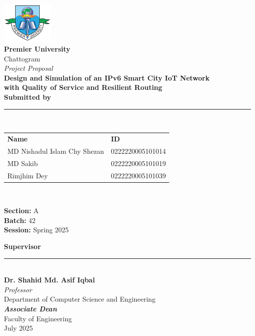 \documentclass[12pt,a4paper]{article}
\begin{document}
\begin{titlepage}
    \begin{center}
        \vspace*{0.4cm}
        \includegraphics[width=0.19\textwidth]{Logo_of_Premier_University_(PU).png}\\[0.8cm]
        
        {\fontsize{28}{34}\selectfont \textbf{Premier University}}\\[0.15cm]
        {\fontsize{17}{21}\selectfont Chattogram}\\[0.6cm]

        {\Large \textit{Project Proposal}}\\[0.2cm]

        {\fontsize{18}{24}\selectfont \textbf{Design and Simulation of an IPv6 Smart City IoT Network}}\\[0.08cm]
        {\fontsize{13}{16}\selectfont \textbf{with Quality of Service and Resilient Routing}}\\[0.7cm]

        {\large \textbf{Submitted by}}\\[0.08cm]
\rule{0.21\textwidth}{0.7pt}\\[0.12cm]

\renewcommand{\arraystretch}{1.2}
\begin{tabular}{p{6.5cm} l}
    \textbf{Name} & \textbf{ID} \\
    MD Nishadul Islam Chy Shezan & 0222220005101014 \\
    MD Sakib & 0222220005101019 \\
    Rimjhim Dey & 0222220005101039 \\
\end{tabular}\\[0.6cm]

\begin{center}
    \textbf{Section:} A \\[0.1cm]
    \textbf{Batch:} 42 \\[0.1cm]
    \textbf{Session:} Spring 2025
\end{center}


        {\large \textbf{Supervisor}}\\[0.08cm]
        \rule{0.17\textwidth}{0.7pt}\\[0.11cm]
        {\textbf{Dr. Shahid Md. Asif Iqbal}}\\
        \textit{Professor}\\
        Department of Computer Science and Engineering\\
        \textbf{\textit{Associate Dean}}\\
        Faculty of Engineering\\[0.35cm]

        \vfill
        {\normalsize July 2025}
    \end{center}
\end{titlepage}
\end{document}
